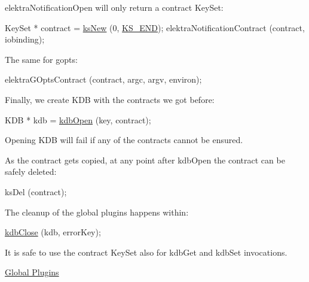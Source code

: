 {\ttfamily elektra\+Notification\+Open} will only return a contract Key\+Set\+:


\begin{DoxyCode}
KeySet * contract = \hyperlink{group__keyset_ga671e1aaee3ae9dc13b4834a4ddbd2c3c}{ksNew} (0, \hyperlink{group__keyset_ga7a28fce3773b2c873c94ac80b8b4cd54}{KS\_END});
elektraNotificationContract (contract, iobinding);
\end{DoxyCode}


The same for gopts\+:


\begin{DoxyCode}
elektraGOptsContract (contract, argc, argv, environ);
\end{DoxyCode}


Finally, we create {\ttfamily K\+DB} with the contracts we got before\+:


\begin{DoxyCode}
KDB * kdb = \hyperlink{group__kdb_ga6808defe5870f328dd17910aacbdc6ca}{kdbOpen} (key, contract);
\end{DoxyCode}


Opening {\ttfamily K\+DB} will fail if any of the contracts cannot be ensured.

As the {\ttfamily contract} gets copied, at any point after {\ttfamily kdb\+Open} the contract can be safely deleted\+:


\begin{DoxyCode}
ksDel (contract);
\end{DoxyCode}


The cleanup of the global plugins happens within\+:


\begin{DoxyCode}
\hyperlink{group__kdb_gadb54dc9fda17ee07deb9444df745c96f}{kdbClose} (kdb, errorKey);
\end{DoxyCode}


It is safe to use the contract {\ttfamily Key\+Set} also for {\ttfamily kdb\+Get} and {\ttfamily kdb\+Set} invocations.


\begin{DoxyItemize}
\item \hyperlink{doc_decisions_global_plugins_md}{Global Plugins}
\end{DoxyItemize}